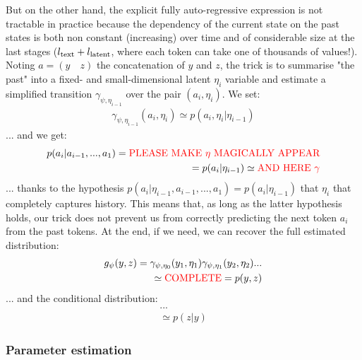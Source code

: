 \documentclass{article}
\begin{document}
\begin{appendix}
\begin{enumerate}
    But on the other hand, the explicit fully auto-regressive expression is not tractable in practice because the dependency of the current state on the past states is both non constant (increasing) over time and of considerable size at the last stages (${l_{\mathrm{text}}} + {l_{\mathrm{latent}}}$, where each token can take one of thousands of values!). Noting $a=(y \quad z)$ the concatenation of $y$ and $z$, the trick is to summarise "the past" into a fixed- and small-dimensional latent $\eta_i$ variable and estimate a simplified transition $\gamma_{\psi,\eta_{i-1}}$ over the pair $(a_i,\eta_i)$. We set:
    \begin{equation*}\begin{split}
    \gamma_{\psi,\eta_{i-1}}(a_i,\eta_{i})\simeq p(a_i,\eta_i|\eta_{i-1})
    \end{split}\end{equation*}
    ... and we get:
    \begin{equation*}\begin{split}
    p(a_i|a_{i-1}, ..., a_1)=\textcolor{red}{\text{PLEASE MAKE } \eta \text{ MAGICALLY APPEAR}}\\=p(a_i|\eta_{i-1})\simeq \textcolor{red}{\text{AND HERE }\gamma}
    \end{split}\end{equation*}
    ... thanks to the hypothesis $p(a_i|\eta_{i-1},a_{i-1},...,a_1)=p(a_i|\eta_{i-1})$ that $\eta_i$ that completely captures history. This means that, as long as the latter hypothesis holds, our trick does not prevent us from correctly predicting the next token $a_i$ from the past tokens. At the end, if we need, we can recover the full estimated distribution:
    \begin{equation*}\begin{split}
    g_\psi(y,z)=\gamma_{\psi,\eta_0}(y_1,\eta_1)\gamma_{\psi,\eta_1}(y_2,\eta_2)...\\ \simeq \textcolor{red}{\text{COMPLETE}}=p(y,z)
    \end{split}\end{equation*}
    ... and the conditional distribution:
    \begin{equation*}\begin{split}
    ...\\ \simeq p(z|y)
    \end{split}\end{equation*}
    
\end{enumerate}

\subsubsection{Parameter estimation}


\end{appendix}
\end{document}
